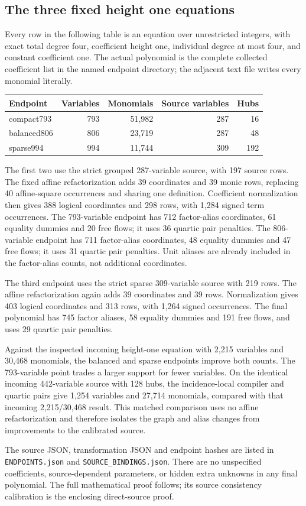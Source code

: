 \subsection{The three fixed height one equations}
Every row in the following table is an equation over unrestricted integers,
with exact total degree four, coefficient height one, individual degree at
most four, and constant coefficient one. The actual polynomial is the
complete collected coefficient list in the named endpoint directory; the
adjacent text file writes every monomial literally.
\begin{center}
\begin{tabular}{lrrrr}
Endpoint & Variables & Monomials & Source variables & Hubs\\\hline
compact793 & 793 & 51,982 & 287 & 16\\
balanced806 & 806 & 23,719 & 287 & 48\\
sparse994 & 994 & 11,744 & 309 & 192
\end{tabular}
\end{center}
The first two use the strict grouped 287-variable source, with 197 source
rows. The fixed affine refactorization adds 39 coordinates and 39 monic
rows, replacing 40 affine-square occurrences and sharing one definition.
Coefficient normalization then gives 388 logical coordinates and 298
rows, with 1,284 signed term occurrences. The 793-variable endpoint has
712 factor-alias coordinates, 61 equality dummies and 20 free flows; it
uses 36 quartic pair penalties. The 806-variable endpoint has 711
factor-alias coordinates, 48 equality dummies and 47 free flows; it uses
31 quartic pair penalties. Unit aliases are already included in the
factor-alias counts, not additional coordinates.

The third endpoint uses the strict sparse 309-variable source with 219
rows. The affine refactorization again adds 39 coordinates and 39 rows.
Normalization gives 403 logical coordinates and 313 rows, with 1,264
signed occurrences. The final polynomial has 745 factor aliases,
58 equality dummies and 191 free flows, and uses 29 quartic pair penalties.

Against the inspected incoming height-one equation with 2,215 variables
and 30,468 monomials, the balanced and sparse endpoints improve both
counts. The 793-variable point trades a larger support for fewer
variables. On the identical incoming 442-variable source with 128 hubs,
the incidence-local compiler and quartic pairs give 1,254 variables and
27,714 monomials, compared with that incoming 2,215/30,468 result. This
matched comparison uses no affine refactorization and therefore isolates
the graph and alias changes from improvements to the calibrated source.

The source JSON, transformation JSON and endpoint hashes are listed in
\texttt{ENDPOINTS.json} and \texttt{SOURCE\_BINDINGS.json}. There are no
unspecified coefficients, source-dependent parameters, or hidden extra
unknowns in any final polynomial. The full mathematical proof follows;
its source consistency calibration is the enclosing direct-source proof.
